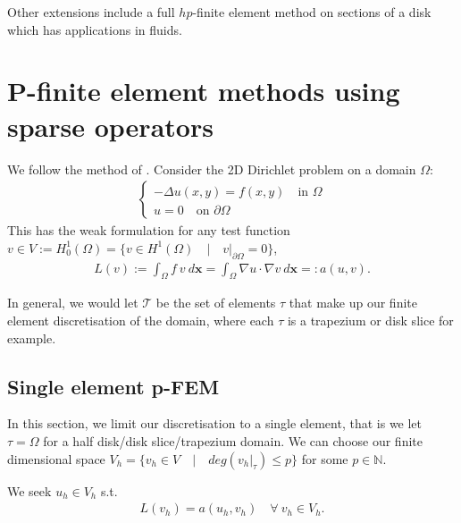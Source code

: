 \documentclass[11pt, oneside]{article}   	%
\newcommand{\N}{\mathbb{N}}
\newcommand{\element}{\tau}
\newcommand{\FEset}{\mathcal{T}}
\begin{document}
Other extensions include a full $hp$-finite element method on sections of a disk which has applications in fluids. 

%
\appendix
%
\section{P-finite element methods using sparse operators}

We follow the method of \cite{beuchler2006new}. Consider the 2D Dirichlet problem on a domain $\Omega$:
\begin{align}
	\begin{cases}
         - \Delta u(x,y) = f(x,y) \quad \text{in } \Omega \\
         u = 0 \quad \text{on } \partial \Omega
         \end{cases}
\end{align}
This has the weak formulation for any test function $v \in V := H_0^1(\Omega) = \{v \in H^1(\Omega) \quad | \quad v|_{\partial \Omega} = 0 \}$,
\begin{align}
	L(v) := \int_\Omega f \: v \: d\mathbf{x} = \int_\Omega \nabla u \cdot \nabla v \: d\mathbf{x} =: a(u,v).
\end{align}

In general, we would let $\FEset$ be the set of elements $\element$ that make up our finite element discretisation of the domain, where each $\element$ is a trapezium or disk slice for example. 

\subsection{Single element p-FEM}
In this section, we limit our discretisation to a single element, that is we let $\element = \Omega$ for a half disk/disk slice/trapezium domain. We can choose our finite dimensional space $V_h = \{v_h \in V \quad | \quad deg(v_h|_\element) \le p\}$ for some $p \in \N$.

We seek $u_h \in V_h$ s.t.
\begin{align}
	L(v_h) = a(u_h,v_h) \quad \forall \: v_h \in V_h.
\end{align}
\end{document}
